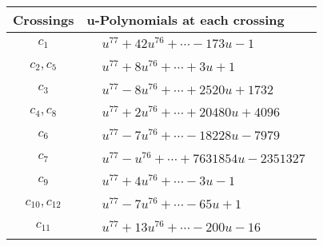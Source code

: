 \documentclass[1p]{elsarticle_modified}
\theoremstyle{definition}
\begin{document}
\begin{tabular}{m{50pt}|m{274pt}}
Crossings & \hspace{64pt}u-Polynomials at each crossing \\
\hline $$\begin{aligned}c_{1}\end{aligned}$$&$\begin{aligned}
&u^{77}+42 u^{76}+\cdots-173 u-1
\end{aligned}$\\
\hline $$\begin{aligned}c_{2},c_{5}\end{aligned}$$&$\begin{aligned}
&u^{77}+8 u^{76}+\cdots+3 u+1
\end{aligned}$\\
\hline $$\begin{aligned}c_{3}\end{aligned}$$&$\begin{aligned}
&u^{77}-8 u^{76}+\cdots+2520 u+1732
\end{aligned}$\\
\hline $$\begin{aligned}c_{4},c_{8}\end{aligned}$$&$\begin{aligned}
&u^{77}+2 u^{76}+\cdots+20480 u+4096
\end{aligned}$\\
\hline $$\begin{aligned}c_{6}\end{aligned}$$&$\begin{aligned}
&u^{77}-7 u^{76}+\cdots-18228 u-7979
\end{aligned}$\\
\hline $$\begin{aligned}c_{7}\end{aligned}$$&$\begin{aligned}
&u^{77}- u^{76}+\cdots+7631854 u-2351327
\end{aligned}$\\
\hline $$\begin{aligned}c_{9}\end{aligned}$$&$\begin{aligned}
&u^{77}+4 u^{76}+\cdots-3 u-1
\end{aligned}$\\
\hline $$\begin{aligned}c_{10},c_{12}\end{aligned}$$&$\begin{aligned}
&u^{77}-7 u^{76}+\cdots-65 u+1
\end{aligned}$\\
\hline $$\begin{aligned}c_{11}\end{aligned}$$&$\begin{aligned}
&u^{77}+13 u^{76}+\cdots-200 u-16
\end{aligned}$\\
\hline
\end{tabular}\\~\\
\end{document}
